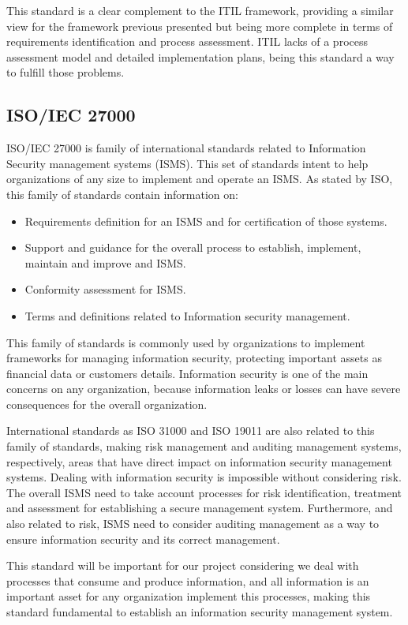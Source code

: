 \begin{itemize}
  \vspace{5mm}

  This standard is a clear complement to the ITIL framework, providing a similar view for the framework previous presented but being more complete in terms of requirements identification and process assessment. ITIL lacks of a process assessment model and detailed implementation plans, being this standard a way to fulfill those problems.\par
  
\end{itemize}

\subsection{ISO/IEC 27000}

ISO/IEC 27000\cite{ISO27000} is family of international standards related to Information Security management systems (ISMS). This set of standards intent to help organizations of any size to implement and operate an ISMS. As stated by ISO, this family of standards contain information on:

\begin{itemize}

\item Requirements definition for an ISMS and for certification of those systems.
\item Support and guidance for the overall process to establish, implement, maintain and improve and ISMS.
\item Conformity assessment for ISMS.
\item Terms and definitions related to Information security management.

\end{itemize}

This family of standards is commonly used by organizations to implement frameworks for managing information security, protecting important assets as financial data or customers details. Information security is one of the main concerns on any organization, because information leaks or losses can have severe consequences for the overall organization.\par
International standards as ISO 31000 and ISO 19011 are also related to this family of standards, making risk management and auditing management systems, respectively, areas that have direct impact on information security management systems. Dealing with information security is impossible without considering risk. The overall ISMS need to take account processes for risk identification, treatment and assessment for establishing a secure management system. Furthermore, and also related to risk, ISMS need to consider auditing management as a way to ensure information security and its correct management.\par
This standard will be important for our project considering we deal with processes that consume and produce information, and all information is an important asset for any organization implement this processes, making this standard fundamental to establish an information security management system.\par


